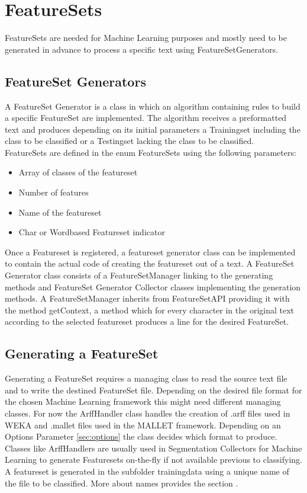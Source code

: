 \documentclass[10pt,a4paper,titlepage]{report}
\begin{document}
	\section{FeatureSets}
	\label{sec:featureset}
	FeatureSets are needed for Machine Learning purposes and mostly need to be generated in advance to process a specific text using FeatureSetGenerators.
	\subsection{FeatureSet Generators}
	\label{sec:featuresetgenerator}
	A FeatureSet Generator is a class in which an algorithm containing rules to build a specific FeatureSet are implemented. The algorithm receives a preformatted text and produces depending on its initial parameters a Trainingset including the class to be classified or a Testingset lacking the class to be classified.\\
	FeatureSets are defined in the enum FeatureSets using the following parameters:
	\begin{itemize}
		\item Array of classes of the featureset
		\item Number of features
		\item Name of the featureset
		\item Char or Wordbased Featureset indicator
	\end{itemize}
	Once a Featureset is registered, a featureset generator class can be implemented to contain the actual code of creating the featureset out of a text. A FeatureSet Generator class consists of a FeatureSetManager linking to the generating methods and FeatureSet Generator Collector classes implementing the generation methods.
	A FeatureSetManager inherits from FeatureSetAPI providing it with the method getContext, a method which for every character in the original text according to the selected featureset produces a line for the desired FeatureSet.\\
	\subsection{Generating a FeatureSet}
	Generating a FeatureSet requires a managing class to read the source text file and to write the destined FeatureSet file. Depending on the desired file format for the chosen Machine Learning framework this might need different managing classes. For now the ArffHandler class handles the creation of .arff files used in WEKA and .mallet files used in the MALLET framework. Depending on an Options Parameter \ref{sec:options} the class decides which format to produce. Classes like ArffHandlers are usually used in Segmentation Collectors for Machine Learning to generate Featuresets on-the-fly if not available previous to classifying. A featureset is generated in the subfolder trainingdata using a unique name of the file to be classified. More about names provides the section .
\end{document}
